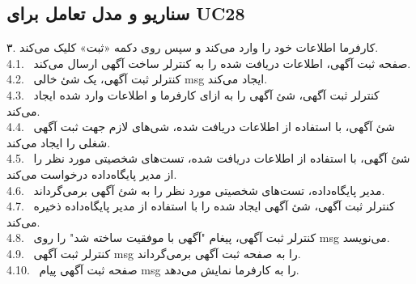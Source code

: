 \documentclass[12pt]{article}
\begin{document}
	\subsection{سناریو و مدل تعامل برای UC28}
	۳. کارفرما اطلاعات خود را وارد می‌کند و سپس روی دکمه «ثبت» کلیک می‌کند. \\
	4.1. \ صفحه ثبت آگهی، اطلاعات دریافت شده را به کنترلر ساخت آگهی ارسال می‌کند.\\
	4.2. \ کنترلر ثبت آگهی، یک شئ خالی msg ایجاد می‌کند.\\
	4.3. \ کنترلر ثبت آگهی، شئ آگهی را به ازای کارفرما و اطلاعات وارد شده ایجاد می‌کند.\\
	4.4. \ شئ آگهی، با استفاده از اطلاعات دریافت شده، شی‌های لازم جهت ثبت آگهی شغلی را ایجاد می‌کند.\\
	4.5. \ شئ آگهی، با استفاده از اطلاعات دریافت شده، تست‌های شخصیتی مورد نظر را از مدیر پایگاه‌داده درخواست می‌کند.\\
	4.6. \ مدیر‌ پایگاه‌داده، تست‌های شخصیتی مورد نظر را به شئ آگهی برمی‌گرداند.\\
	4.7. \ کنترلر ثبت آگهی، شئ آگهی ایجاد شده را با استفاده از مدیر پایگاه‌داده ذخیره می‌کند.\\
	4.8. \ کنترلر ثبت آگهی، پیغام "آگهی با موفقیت ساخته شد" را روی msg می‌نویسد.\\
	4.9. \ کنترلر ثبت آگهی msg را به صفحه ثبت آگهی برمی‌گرداند.\\
	4.10. \ صفحه ثبت آگهی پیام msg را به کارفرما نمایش می‌دهد.\\
\end{document}
